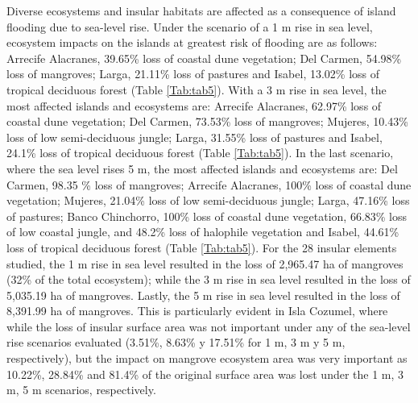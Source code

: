 \documentclass{article} %
\begin{document}
Diverse ecosystems and insular habitats are affected as a consequence of island
flooding due to sea-level rise. Under the scenario of a 1 m rise in sea level, ecosystem
impacts on the islands at greatest risk of flooding are as follows: Arrecife Alacranes,
39.65\% loss of coastal dune vegetation; Del Carmen, 54.98\% loss of mangroves;
Larga, 21.11\% loss of pastures and Isabel, 13.02\% loss of tropical deciduous forest
(Table \ref{Tab:tab5}). With a 3 m rise in sea level, the most affected islands and ecosystems are:
Arrecife Alacranes, 62.97\% loss of coastal dune vegetation; Del Carmen, 73.53\%
loss of mangroves; Mujeres, 10.43\% loss of low semi-deciduous jungle; Larga,
31.55\% loss of pastures and Isabel, 24.1\% loss of tropical deciduous forest (Table \ref{Tab:tab5}). In the last scenario, where the sea level rises 5 m, the most affected islands and
ecosystems are: Del Carmen, 98.35 \% loss of mangroves; Arrecife Alacranes, 100\%
loss of coastal dune vegetation; Mujeres, 21.04\% loss of low semi-deciduous jungle;
Larga, 47.16\% loss of pastures; Banco Chinchorro, 100\% loss of coastal dune
vegetation, 66.83\% loss of low coastal jungle, and 48.2\% loss of halophile vegetation
and Isabel, 44.61\% loss of tropical deciduous forest (Table \ref{Tab:tab5}). For the 28 insular
elements studied, the 1 m rise in sea level resulted in the loss of 2,965.47 ha of
mangroves (32\% of the total ecosystem); while the 3 m rise in sea level resulted in
the loss of 5,035.19 ha of mangroves. Lastly, the 5 m rise in sea level resulted in the
loss of 8,391.99 ha of mangroves. This is particularly evident in Isla Cozumel, where
while the loss of insular surface area was not important under any of the sea-level
rise scenarios evaluated (3.51\%, 8.63\% y 17.51\% for 1 m, 3 m y 5 m, respectively),
but the impact on mangrove ecosystem area was very important as 10.22\%, 28.84\%
and 81.4\% of the original surface area was lost under the 1 m, 3 m, 5 m scenarios,
respectively.
\end{document}
